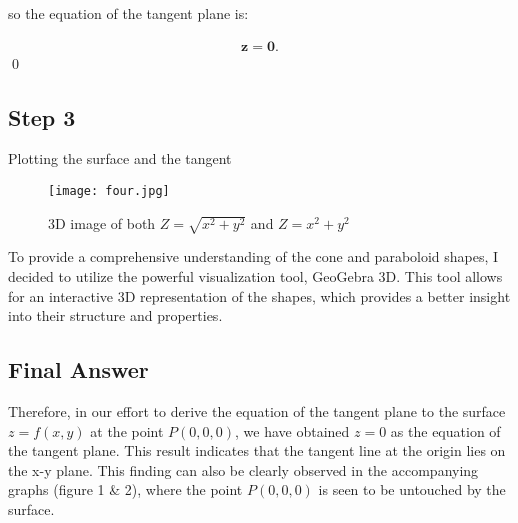 \documentclass[english]{article}
\begin{document}
\noindent so the equation of the tangent plane is:

\begin{align*}
    \mathbf{z = 0}.
\end{align*}
\qed

\subsection{Step 3}
Plotting the surface and the tangent

    \begin{figure}[H]
    \centering
    \texttt{[image: four.jpg]}
    \caption*{3D image of both $Z = \sqrt{x^2 + y^2}$ and $Z = x^2 + y^2$}
\end{figure}



To provide a comprehensive understanding of the cone and paraboloid shapes, I decided to utilize the powerful visualization tool, GeoGebra 3D. This tool allows for an interactive 3D representation of the shapes, which provides a better insight into their structure and properties. 
\\

\subsection{Final Answer}
Therefore, in our effort to derive the equation of the tangent plane to the surface $z=f(x,y)$ at the point $P(0,0,0)$, we have obtained $z=0$ as the equation of the tangent plane. This result indicates that the tangent line at the origin lies on the x-y plane. This finding can also be clearly observed in the accompanying graphs (figure 1 \& 2), where the point $P(0,0,0)$ is seen to be untouched by the surface.



\end{document}
